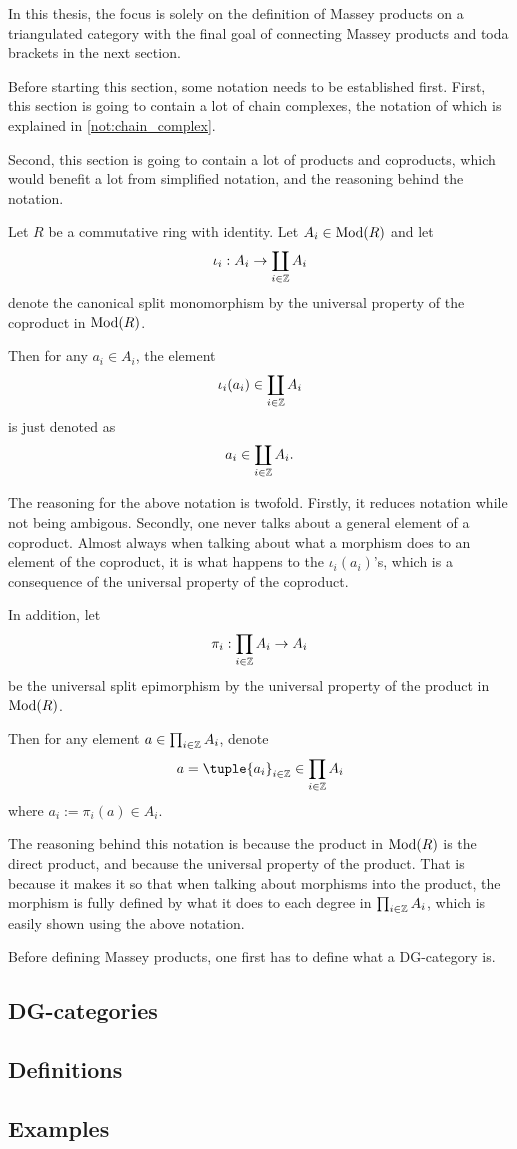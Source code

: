 In this thesis, the focus is solely on the definition of Massey products on a triangulated category with the final goal of connecting Massey products and toda brackets in the next section.

Before starting this section, some notation needs to be established first. First, this section is going to contain a lot of chain complexes, the notation of which is explained in \autoref{not:chain_complex}.

Second, this section is going to contain a lot of products and coproducts, which would benefit a lot from simplified notation, and the reasoning behind the notation.

\begin{notation}
    Let \( R \) be a commutative ring with identity. Let \( A_i \in \operatorname{Mod}(R) \) and let
    \[
        \iota_i: A_i \to \coprod_{i \in {\mathbb{Z}}} A_i
    \]
    denote the canonical split monomorphism by the universal property of the coproduct in \( \operatorname{Mod}(R) \).

    Then for any \( a_i \in A_i \), the element
    \[
        \iota_i(a_i) \in \coprod_{i \in {\mathbb{Z}}} A_i
    \]
    is just denoted as
    \[
        a_i \in \coprod_{i \in {\mathbb{Z}}} A_i.
    \]
    
    The reasoning for the above notation is twofold. Firstly, it reduces notation while not being ambigous. Secondly, one never talks about a general element of a coproduct. Almost always when talking about what a morphism does to an element of the coproduct, it is what happens to the \( \iota_i(a_i) \)'s, which is a consequence of the universal property of the coproduct.

    In addition, let 
    \[
        \pi_i: \prod_{i \in {\mathbb{Z}}} A_i \to A_i
    \]
    be the universal split epimorphism by the universal property of the product in \( \operatorname{Mod}(R) \).
    
    Then for any element \( a \in \prod_{i \in {\mathbb{Z}}} A_i \), denote
    \[
        a = \tuple{a_i}_{i \in \Zb} \in \prod_{i \in \Zb} A_i
    \]
    where \( a_i := \pi_i(a) \in A_i \).
    
    The reasoning behind this notation is because the product in \( \operatorname{Mod}(R) \) is the direct product, and because the universal property of the product. That is because it makes it so that when talking about morphisms into the product, the morphism is fully defined by what it does to each degree in \( \prod_{i \in {\mathbb{Z}}} A_i \), which is easily shown using the above notation.
\end{notation}

Before defining Massey products, one first has to define what a DG-category is.

\subsection{DG-categories}


\subsection{Definitions}


\subsection{Examples}
